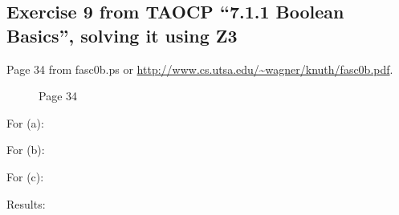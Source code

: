 \subsection{Exercise 9 from TAOCP ``7.1.1 Boolean Basics'', solving it using Z3}

Page 34 from fasc0b.ps or \url{http://www.cs.utsa.edu/~wagner/knuth/fasc0b.pdf}.

\begin{figure}[H]
\label{fig:pipe_shuffled}
\centering
{}
\caption{Page 34}
\end{figure}

For (a):



For (b):



For (c):



Results:



